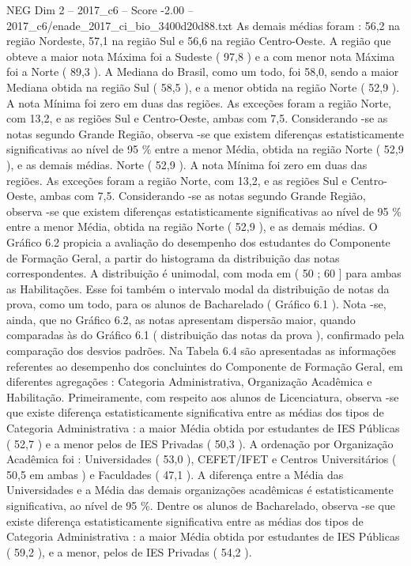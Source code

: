 \begin{textsample}{NEG Dim 2 – 2017\_c6 – Score -2.00 – 2017\_c6/enade\_2017\_ci\_bio\_3400d20d88.txt}
As demais médias foram : 56,2 na região Nordeste, 57,1 na região Sul e 56,6 na região Centro-Oeste.
A região que obteve a maior nota Máxima foi a Sudeste ( 97,8 ) e a com menor nota Máxima foi a Norte ( 89,3 ).
A Mediana do Brasil, como um todo, foi 58,0, sendo a maior Mediana obtida na região Sul ( 58,5 ), e a menor obtida na região Norte ( 52,9 ).
A nota Mínima foi zero em duas das regiões.
As exceções foram a região Norte, com 13,2, e as regiões Sul e Centro-Oeste, ambas com 7,5.
Considerando -se as notas segundo Grande Região, observa -se que existem diferenças estatisticamente significativas ao nível de 95 \% entre a menor Média, obtida na região Norte ( 52,9 ), e as demais médias.
Norte ( 52,9 ).
A nota Mínima foi zero em duas das regiões.
As exceções foram a região Norte, com 13,2, e as regiões Sul e Centro-Oeste, ambas com 7,5.
Considerando -se as notas segundo Grande Região, observa -se que existem diferenças estatisticamente significativas ao nível de 95 \% entre a menor Média, obtida na região Norte ( 52,9 ), e as demais médias.
O Gráfico 6.2 propicia a avaliação do desempenho dos estudantes do Componente de Formação Geral, a partir do histograma da distribuição das notas correspondentes.
A distribuição é unimodal, com moda em ( 50 ; 60 ] para ambas as Habilitações.
Esse foi também o intervalo modal da distribuição de notas da prova, como um todo, para os alunos de Bacharelado ( Gráfico 6.1 ).
Nota -se, ainda, que no Gráfico 6.2, as notas apresentam dispersão maior, quando comparadas às do Gráfico 6.1 ( distribuição das notas da prova ), confirmado pela comparação dos desvios padrões.
Na Tabela 6.4 são apresentadas as informações referentes ao desempenho dos concluintes do Componente de Formação Geral, em diferentes agregações : Categoria Administrativa, Organização Acadêmica e Habilitação.
Primeiramente, com respeito aos alunos de Licenciatura, observa -se que existe diferença estatisticamente significativa entre as médias dos tipos de Categoria Administrativa : a maior Média obtida por estudantes de IES Públicas ( 52,7 ) e a menor pelos de IES Privadas ( 50,3 ).
A ordenação por Organização Acadêmica foi : Universidades ( 53,0 ), CEFET/IFET e Centros Universitários ( 50,5 em ambas ) e Faculdades ( 47,1 ).
A diferença entre a Média das Universidades e a Média das demais organizações acadêmicas é estatisticamente significativa, ao nível de 95 \%.
Dentre os alunos de Bacharelado, observa -se que existe diferença estatisticamente significativa entre as médias dos tipos de Categoria Administrativa : a maior Média obtida por estudantes de IES Públicas ( 59,2 ), e a menor, pelos de IES Privadas ( 54,2 ).

\end{textsample}
